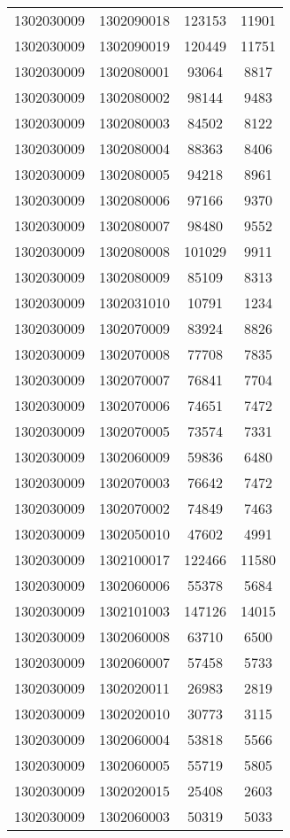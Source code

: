 \begin{longtable}{llcc}
1302030009 & 1302090018 & 123153 & 11901\\
1302030009 & 1302090019 & 120449 & 11751\\
1302030009 & 1302080001 & 93064 & 8817\\
1302030009 & 1302080002 & 98144 & 9483\\
1302030009 & 1302080003 & 84502 & 8122\\
1302030009 & 1302080004 & 88363 & 8406\\
1302030009 & 1302080005 & 94218 & 8961\\
1302030009 & 1302080006 & 97166 & 9370\\
1302030009 & 1302080007 & 98480 & 9552\\
1302030009 & 1302080008 & 101029 & 9911\\
1302030009 & 1302080009 & 85109 & 8313\\
1302030009 & 1302031010 & 10791 & 1234\\
1302030009 & 1302070009 & 83924 & 8826\\
1302030009 & 1302070008 & 77708 & 7835\\
1302030009 & 1302070007 & 76841 & 7704\\
1302030009 & 1302070006 & 74651 & 7472\\
1302030009 & 1302070005 & 73574 & 7331\\
1302030009 & 1302060009 & 59836 & 6480\\
1302030009 & 1302070003 & 76642 & 7472\\
1302030009 & 1302070002 & 74849 & 7463\\
1302030009 & 1302050010 & 47602 & 4991\\
1302030009 & 1302100017 & 122466 & 11580\\
1302030009 & 1302060006 & 55378 & 5684\\
1302030009 & 1302101003 & 147126 & 14015\\
1302030009 & 1302060008 & 63710 & 6500\\
1302030009 & 1302060007 & 57458 & 5733\\
1302030009 & 1302020011 & 26983 & 2819\\
1302030009 & 1302020010 & 30773 & 3115\\
1302030009 & 1302060004 & 53818 & 5566\\
1302030009 & 1302060005 & 55719 & 5805\\
1302030009 & 1302020015 & 25408 & 2603\\
1302030009 & 1302060003 & 50319 & 5033\\

\end{longtable}
